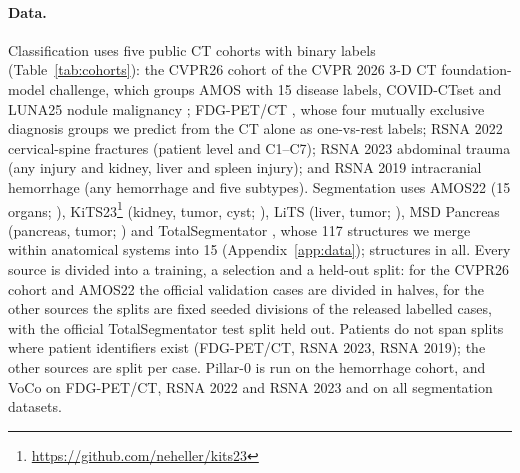 \paragraph{Data.} Classification uses five public CT cohorts with \numLabelsN{} binary labels (Table~\ref{tab:cohorts}): the CVPR26 cohort of the CVPR 2026 3-D CT foundation-model challenge, which groups AMOS \citep{ji2022amos} with 15 disease labels, COVID-CTset \citep{rahimzadeh2021covidctset} and LUNA25 nodule malignancy \citep{peeters2026luna25}; FDG-PET/CT \citep{gatidis2022fdgpetct}, whose four mutually exclusive diagnosis groups we predict from the CT alone as one-vs-rest labels; RSNA 2022 cervical-spine fractures \citep{lin2023rsnacsfdata} (patient level and C1--C7); RSNA 2023 abdominal trauma \citep{rudie2024ratic} (any injury and kidney, liver and spleen injury); and RSNA 2019 intracranial hemorrhage \citep{flanders2020rsnaich} (any hemorrhage and five subtypes). Segmentation uses AMOS22 (15 organs; \citealp{ji2022amos}), KiTS23\footnote{\url{https://github.com/neheller/kits23}} (kidney, tumor, cyst; \citealp{heller2023kits21}), LiTS (liver, tumor; \citealp{bilic2023lits}), MSD Pancreas (pancreas, tumor; \citealp{antonelli2022msd}) and TotalSegmentator \citep{wasserthal2023totalsegmentator,wasserthal2026totalsegdata}, whose 117 structures we merge within anatomical systems into 15 (Appendix~\ref{app:data}); \numStructuresN{} structures in all. Every source is divided into a training, a selection and a held-out split: for the CVPR26 cohort and AMOS22 the official validation cases are divided in halves, for the other sources the splits are fixed seeded divisions of the released labelled cases, with the official TotalSegmentator test split held out. Patients do not span splits where patient identifiers exist (FDG-PET/CT, RSNA 2023, RSNA 2019); the other sources are split per case. Pillar-0 is run on the hemorrhage cohort, and VoCo on FDG-PET/CT, RSNA 2022 and RSNA 2023 and on all segmentation datasets.

